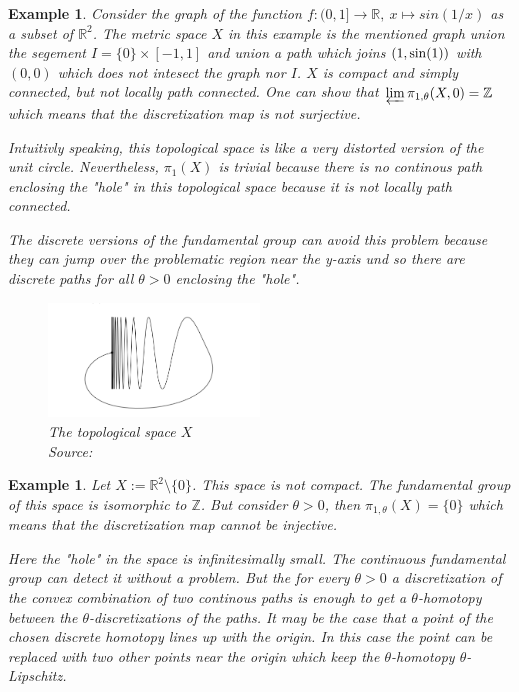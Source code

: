 \documentclass[a4paper, 11pt, twoside]{article}
\newcommand{\R}[0]{\mathbb{R}}
\theoremstyle{break}
\theoremstyle{break}
\newtheorem{ex}[thm]{Example}
\begin{document}
\begin{ex}
  Consider the graph of the function $f\colon (0, 1] \to \R, \: x \mapsto sin(1/x)$ as a subset of $\R^2$. 
  The metric space $X$ in this example is the mentioned graph union the segement $I = \{0\} \times [-1, 1]$ and union a path which joins $(1, {\rm sin}(1))$ with $(0, 0)$ 
  which does not intesect the graph nor $I$.
  $X$ is compact and simply connected, but not locally path connected.
  One can show that $\varprojlim \pi_{1,\theta}(X, 0) = \mathbb{Z}$ which means that the discretization map is not surjective.

  Intuitivly speaking, this topological space is like a very distorted version of the unit circle. 
  Nevertheless, $\pi_1(X)$ is trivial because there is no continous path enclosing the "hole" in this topological space because it is not locally path connected.
  
  The discrete versions of the fundamental group can avoid this problem because they can jump over the problematic region near the y-axis und so there are discrete paths for all 
  $\theta > 0$ enclosing the "hole".
  
  \begin{figure}[ht!]
    \centering
    \includegraphics[width=0.5\textwidth]{ex1.png}
    \caption{The topological space $X$ \\ Source: \cite[p. 8]{vigolo2018fundamental}}
  \end{figure}
\end{ex}

\begin{ex}
  Let $X := \R^2 \setminus \{0\}$. This space is not compact. The fundamental group of this space is isomorphic to $\mathbb{Z}$. 
  But consider $\theta > 0$, then $\pi_{1,\theta}(X) = \{0\}$ which means that the discretization map cannot be injective.

  Here the "hole" in the space is infinitesimally small. The continuous fundamental group can detect it without a problem. 
  But the for every $\theta > 0$ a discretization of the convex combination of two continous paths is enough to get a $\theta$-homotopy between the 
  $\theta$-discretizations of the paths. 
  It may be the case that a point of the chosen discrete homotopy lines up with the origin.
  In this case the point can be replaced with two other points near the origin which keep the $\theta$-homotopy $\theta$-Lipschitz.  
\end{ex}

\clearpage

\end{document}
